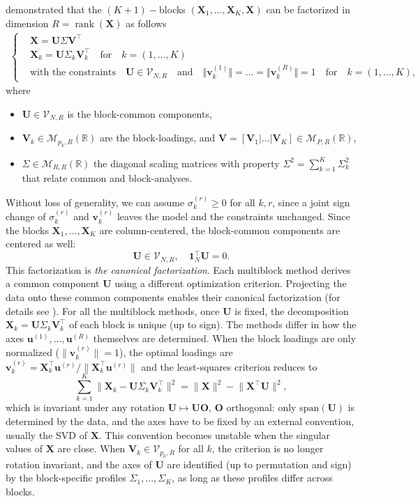 \documentclass[11pt]{article}
\DeclareMathOperator{\rank}{rank}
\newcommand{\X}{\mathbf{X}}
\newcommand{\U}{\mathbf{U}}
\newcommand{\V}{\mathbf{V}}
\newcommand{\uu}{\mathbf{u}}
\newcommand{\vv}{\mathbf{v}}
\newcommand{\one}{\mathbf{1}}
\newcommand{\Stiefel}[2]{\mathcal V_{#1,#2}}
\begin{document}
\cite{bougeard2024} demonstrated that the $(K+1)-$blocks $(\textbf{X}_1,\ldots,\textbf{X}_K,\textbf{X})$ can be factorized in dimension $R=\rank(\textbf{X})$ as follows  
\begin{align}
  \left\{
	\begin{array}{ll}
		&\X   = \U \Sigma \V^\intercal   \\
		&\X_k = \U \Sigma_k \V_k^\intercal \quad \textrm{for} \quad k=(1, \dots, K)    \\	
		&\textrm{with the constraints} \quad \U\in \Stiefel{N}{R} \quad \textrm{and} \quad \Vert\vv_k^{(1)}\Vert=\ldots=\Vert\vv_k^{(R)}\Vert=1 \quad \textrm{for} \quad k=(1, \dots, K), 
	\end{array}
	\right. \label{Cano_Facto}
\end{align}
where
\begin{itemize}
	\item $\U\in \Stiefel{N}{R}$ is the block-common components,
	\item $\V_k \in \mathcal M_{p_k,R}(\mathbb R)$ are the  block-loadings, and $\V=[\V_1|...|\V_K] \in \mathcal M_{P,R}(\mathbb R)$,
  \item $\Sigma\in \mathcal M_{R,R}(\mathbb R)$ the diagonal scaling matrices with property $\Sigma^2 = \sum_{k=1}^K \Sigma_k^2$ that relate common and block-analyses.
\end{itemize}
Without loss of generality, we can assume $\sigma_k^{(r)}\geq 0$ for all $k,r$, since a joint sign change of $\sigma_k^{(r)}$ and $\vv_k^{(r)}$ leaves the model and the constraints unchanged. Since the blocks $\X_1,\ldots,\X_K$ are column-centered, the block-common components are centered as well:
\[\U\in\Stiefel{N}{R}, \quad \one_N^\intercal\U=0.\]
This factorization is \textit{the canonical factorization}. Each multiblock method derives a common component $\U$ using a different optimization criterion. Projecting the data onto these common components enables their canonical factorization (for details see \cite{bougeard2024}). For all the multiblock methods, once $\U$ is fixed, the decomposition $\X_k=\U\Sigma_k\V_k^\intercal$ of each block is unique (up to sign). The methods differ in how the axes $\uu^{(1)},\ldots,\uu^{(R)}$ themselves are determined. When the block loadings are only normalized ($\|\vv_k^{(r)}\|=1$), the optimal loadings are
$\vv_k^{(r)}=\X_k^\intercal\uu^{(r)}/\|\X_k^\intercal\uu^{(r)}\|$ and the least-squares criterion reduces to
\[
  \sum_{k=1}^K\bigl\|\X_k-\U\Sigma_k\V_k^\intercal\bigr\|^2=\|\X\|^2-\bigl\|\X^\intercal\U\bigr\|^2 ,
\]
which is invariant under any rotation $\U\mapsto\U\mathbf O$, $\mathbf O$ orthogonal: only $\mathrm{span}(\U)$ is determined by the data, and the axes have to be fixed by an external convention, usually the SVD of $\X$. This convention becomes unstable when the singular values of $\X$ are close. When $\V_k\in\Stiefel{p_k}{R}$ for all $k$, the criterion is no longer rotation invariant, and the axes of $\U$ are identified (up to permutation and sign) by the block-specific profiles $\Sigma_1,\ldots,\Sigma_K$, as long as these profiles differ across blocks. 
 
\end{document}
